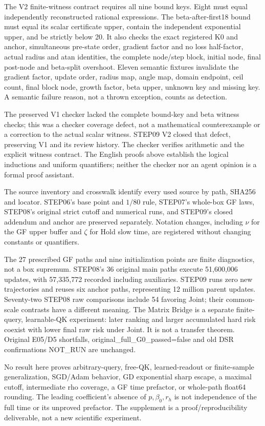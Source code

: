 \documentclass[11pt,a4paper]{article}
\begin{document}
The V2 finite-witness contract requires all nine bound keys. Eight must equal independently reconstructed rational expressions. The beta-after-first18 bound must equal its scalar certificate upper, contain the independent exponential upper, and be strictly below 20. It also checks the exact registered K0 and anchor, simultaneous pre-state order, gradient factor and no loss half-factor, actual radius and atan identities, the complete node/step block, initial node, final post-node and beta-split overshoot. Eleven semantic fixtures invalidate the gradient factor, update order, radius map, angle map, domain endpoint, ceil count, final block node, growth factor, beta upper, unknown key and missing key. A semantic failure reason, not a thrown exception, counts as detection.

The preserved V1 checker lacked the complete bound-key and beta witness checks; this was a checker coverage defect, not a mathematical counterexample or a correction to the actual scalar witness. STEP09 V2 closed that defect, preserving V1 and its review history. The checker verifies arithmetic and the explicit witness contract. The English proofs above establish the logical inductions and uniform quantifiers; neither the checker nor an agent opinion is a formal proof assistant.

The source inventory and crosswalk identify every used source by path, SHA256 and locator. STEP06's base point and $1/80$ rule, STEP07's whole-box GF laws, STEP08's original strict cutoff and numerical runs, and STEP09's closed addendum and anchor are preserved separately. Notation changes, including $\nu$ for the GF upper buffer and $\zeta$ for Hold slow time, are registered without changing constants or quantifiers.

The 27 prescribed GF paths and nine initialization points are finite diagnostics, not a box supremum. STEP08's 36 original main paths execute 51,600,006 updates, with 57,335,772 recorded including auxiliaries. STEP09 runs zero new trajectories and reuses six anchor paths, representing 12 million parent updates. Seventy-two STEP08 raw comparisons include 54 favoring Joint; their common-scale contrasts have a different meaning. The Matrix Bridge is a separate finite-query, learnable-QK experiment: later ranking and larger accumulated hard risk coexist with lower final raw risk under Joint. It is not a transfer theorem. Original E05/D5 shortfalls, original\_full\_G0\_passed=false and old DSR confirmations NOT\_RUN are unchanged.

No result here proves arbitrary-query, free-QK, learned-readout or finite-sample generalization, SGD/Adam behavior, GD exponential sharp escape, a maximal cutoff, intermediate rho coverage, a GF time prefactor, or whole-path float64 rounding. The leading coefficient's absence of $p,\beta_0,r_h$ is not independence of the full time or its unproved prefactor. The supplement is a proof/reproducibility deliverable, not a new scientific experiment.
\end{document}
